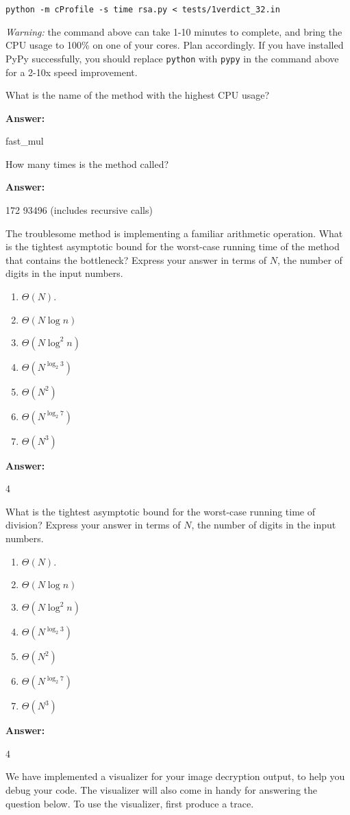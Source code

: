 \documentclass[12pt,twoside]{article}
\newcommand{\answer}{
 \par\medskip
 \textbf{Answer:}
}
\newcommand{\answerIIIa}{ \answer 
fast_mul
}
\newcommand{\answerIIIb}{ \answer
172 93496 (includes recursive calls)
}
\newcommand{\answerIIIc}{ \answer
4
}
\newcommand{\answerIIId}{ \answer
4
}
\begin{document}
\begin{problems}
\begin{problemparts}
\texttt{python -m cProfile -s time rsa.py < tests/1verdict\_32.in}

\textit{Warning:} the command above can take 1-10 minutes to complete, and
bring the CPU usage to 100\% on one of your cores. Plan accordingly. If
you have installed PyPy successfully, you should replace \texttt{python} with
\texttt{pypy} in the command above for a 2-10x speed improvement. 

What is the name of the method with the highest CPU usage?
\answerIIIa

\problempart {} How many times is the method called?
\answerIIIb

\problempart {} The troublesome method is implementing a familiar
arithmetic operation. What is the tightest asymptotic bound for the worst-case
running time of the method that contains the bottleneck? Express your answer in
terms of $N$, the number of digits in the input numbers.
\begin{enumerate}
  \item $\Theta(N)$.
  \item $\Theta(N \log n)$
  \item $\Theta(N \log^2 n)$
  \item $\Theta(N^{\log_{2} 3})$
  \item $\Theta(N^2)$
  \item $\Theta(N^{\log_{2} 7})$
  \item $\Theta(N^3)$
\end{enumerate}
\answerIIIc

\problempart {} What is the tightest asymptotic bound for the worst-case
running time of division? Express your answer in terms of $N$, the number of
digits in the input numbers.
\begin{enumerate}
  \item $\Theta(N)$.
  \item $\Theta(N \log n)$
  \item $\Theta(N \log^2 n)$
  \item $\Theta(N^{\log_{2} 3})$
  \item $\Theta(N^2)$
  \item $\Theta(N^{\log_{2} 7})$
  \item $\Theta(N^3)$
\end{enumerate}
\answerIIId

\end{problemparts}

We have implemented a visualizer for your image decryption output, to help you
debug your code. The visualizer will also come in handy for answering the
question below. To use the visualizer, first produce a trace.


\end{problems}
\end{document}
